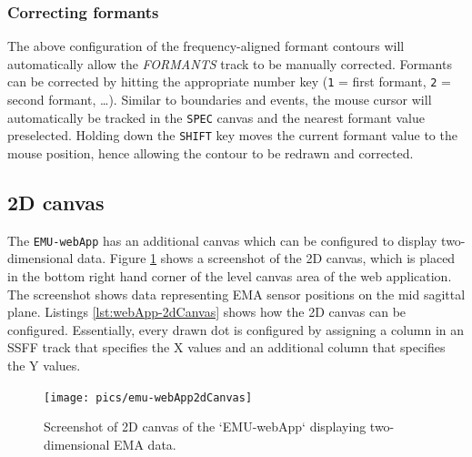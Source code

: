 \documentclass[]{book}
\begin{document}
\hypertarget{correcting-formants}{%
\subsubsection{Correcting formants}\label{correcting-formants}}

The above configuration of the frequency-aligned formant contours will automatically allow the \emph{FORMANTS} track to be manually corrected. Formants can be corrected by hitting the appropriate number key (\texttt{1} = first formant, \texttt{2} = second formant, \ldots{}). Similar to boundaries and events, the mouse cursor will automatically be tracked in the \texttt{SPEC} canvas and the nearest formant value preselected. Holding down the \texttt{SHIFT} key moves the current formant value to the mouse position, hence allowing the contour to be redrawn and corrected.

\hypertarget{d-canvas}{%
\subsection{2D canvas}\label{d-canvas}}

The \texttt{EMU-webApp} has an additional canvas which can be configured to display two-dimensional data. Figure \ref{fig:webApp-2dCanvas} shows a screenshot of the 2D canvas, which is placed in the bottom right hand corner of the level canvas area of the web application. The screenshot shows data representing EMA sensor positions on the mid sagittal plane. Listings \ref{lst:webApp-2dCanvas} shows how the 2D canvas can be configured. Essentially, every drawn dot is configured by assigning a column in an SSFF track that specifies the X values and an additional column that specifies the Y values.

\begin{figure}

{\centering \texttt{[image: pics/emu-webApp2dCanvas]} 

}

\caption{Screenshot of 2D canvas of the `EMU-webApp` displaying two-dimensional EMA data.}\label{fig:webApp-2dCanvas}
\end{figure}
\end{document}
